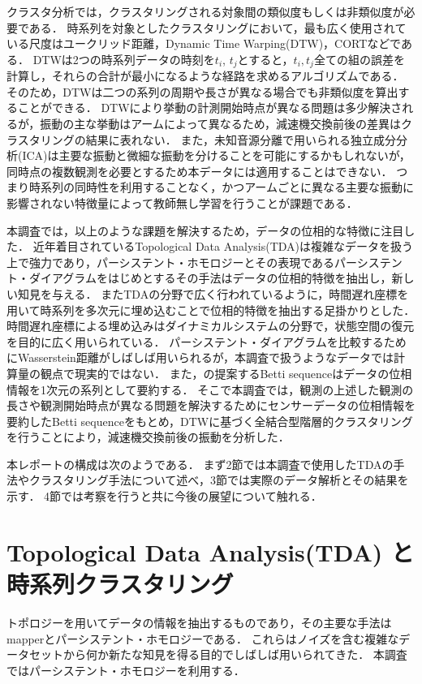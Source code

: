 \documentclass{jarticle}
\begin{document}
クラスタ分析では，クラスタリングされる対象間の類似度もしくは非類似度が必要である．
時系列を対象としたクラスタリングにおいて，最も広く使用されている尺度はユークリッド距離，Dynamic Time Warping(DTW)\cite{Berndt1996}，CORT\cite{Chouakria2007}などである．
DTWは2つの時系列データの時刻を$t_i$, $t_j$とすると，$t_i,t_j$全ての組の誤差を計算し，それらの合計が最小になるような経路を求めるアルゴリズムである．
そのため，DTWは二つの系列の周期や長さが異なる場合でも非類似度を算出することができる．
DTWにより挙動の計測開始時点が異なる問題は多少解決されるが，振動の主な挙動はアームによって異なるため，減速機交換前後の差異はクラスタリングの結果に表れない．
また，未知音源分離で用いられる独立成分分析(ICA)は主要な振動と微細な振動を分けることを可能にするかもしれないが，同時点の複数観測を必要とするため本データには適用することはできない．
つまり時系列の同時性を利用することなく，かつアームごとに異なる主要な振動に影響されない特徴量によって教師無し学習を行うことが課題である．


本調査では，以上のような課題を解決するため，データの位相的な特徴に注目した．
近年着目されているTopological Data Analysis(TDA)は複雑なデータを扱う上で強力であり，パーシステント・ホモロジー\cite{Edelsbrunner2002}とその表現であるパーシステント・ダイアグラム\cite{Otter2017}をはじめとするその手法はデータの位相的特徴を抽出し，新しい知見を与える．
またTDAの分野で広く行われているように，時間遅れ座標を用いて時系列を多次元に埋め込むことで位相的特徴を抽出する足掛かりとした．
時間遅れ座標による埋め込みはダイナミカルシステムの分野で，状態空間の復元を目的に広く用いられている．
パーシステント・ダイアグラムを比較するためにWasserstein距離\cite{Mileyko2011}がしばしば用いられるが，本調査で扱うようなデータでは計算量の観点で現実的ではない．
また，\cite{Umeda2017}の提案するBetti sequenceはデータの位相情報を1次元の系列として要約する．
そこで本調査では，観測の上述した観測の長さや観測開始時点が異なる問題を解決するためにセンサーデータの位相情報を要約したBetti sequenceをもとめ，DTWに基づく全結合型階層的クラスタリングを行うことにより，減速機交換前後の振動を分析した．


本レポートの構成は次のようである．
まず2節では本調査で使用したTDAの手法やクラスタリング手法について述べ，3節では実際のデータ解析とその結果を示す．
4節では考察を行うと共に今後の展望について触れる．

\section{Topological Data Analysis(TDA) と時系列クラスタリング}
トポロジーを用いてデータの情報を抽出するものであり，その主要な手法はmapper\cite{Singh2007}とパーシステント・ホモロジー\cite{Edelsbrunner2002}である．
これらはノイズを含む複雑なデータセットから何か新たな知見を得る目的でしばしば用いられてきた．
本調査ではパーシステント・ホモロジーを利用する．
\end{document}
